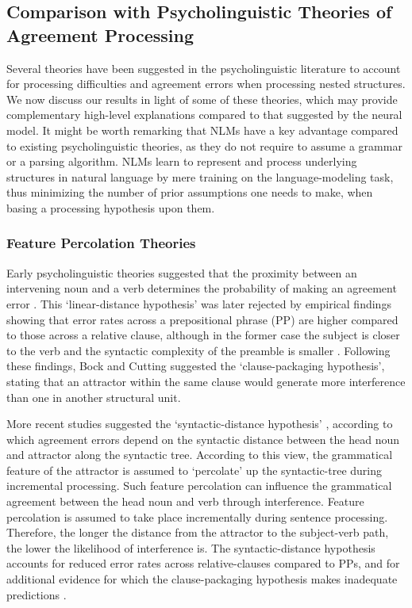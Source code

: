 \subsection{Comparison with Psycholinguistic Theories of Agreement Processing}
Several theories have been suggested in the psycholinguistic literature to account for processing difficulties and agreement errors when processing nested structures. We now discuss our results in light of some of these theories, which may provide complementary high-level explanations compared to that suggested by the neural model. It might be worth remarking that NLMs have a key advantage compared to existing psycholinguistic theories, as they do not require to assume a grammar or a parsing algorithm. NLMs learn to represent and process underlying structures in natural language by mere training on the language-modeling task, thus minimizing the number of prior assumptions one needs to make, when basing a processing hypothesis upon them.


\subsubsection{Feature Percolation Theories}
Early psycholinguistic theories suggested that the proximity between an intervening noun and a verb determines the probability of making an agreement error \citep{quirk1972grammar}. This `linear-distance hypothesis' was later rejected by empirical findings showing that error rates across a prepositional phrase (PP) are higher compared to those across a relative clause, although in the former case the subject is closer to the verb and the syntactic complexity of the preamble is smaller \citep{bock1992regulating}. Following these findings, Bock and Cutting suggested the `clause-packaging hypothesis', stating that an attractor within the same clause would generate more interference than one in another structural unit. 

More recent studies suggested the `syntactic-distance hypothesis' \citep{vigliocco1995constructing, vigliocco1999sex, franck2002subject}, according to which agreement errors depend on the syntactic distance between the head noun and attractor along the syntactic tree. According to this view, the grammatical feature of the attractor is assumed to `percolate’ up the syntactic-tree during incremental processing. Such feature percolation can influence the grammatical agreement between the head noun and verb through interference. Feature percolation is assumed to take place incrementally during sentence processing. Therefore, the longer the distance from the attractor to the subject-verb path, the lower the likelihood of interference is. The syntactic-distance hypothesis accounts for reduced error rates across relative-clauses compared to PPs, and for additional evidence for which the clause-packaging hypothesis makes inadequate predictions \citep{franck2002subject}.

